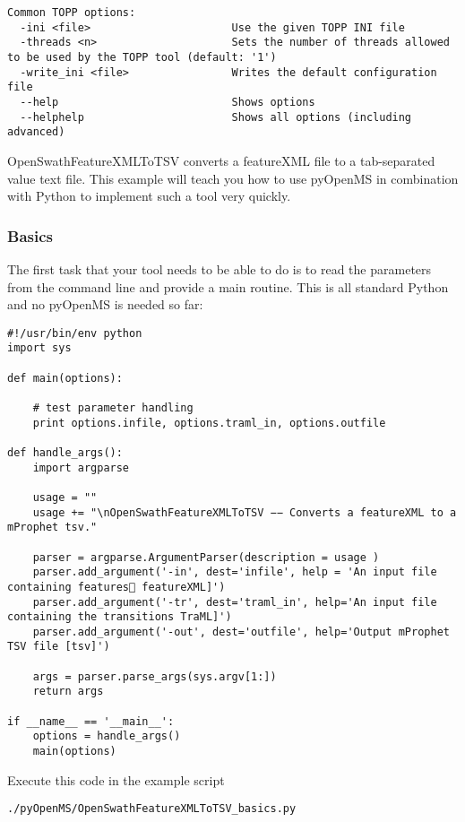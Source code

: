 {\begin{lstlisting}
Common TOPP options:
  -ini <file>                      Use the given TOPP INI file
  -threads <n>                     Sets the number of threads allowed to be used by the TOPP tool (default: '1')
  -write_ini <file>                Writes the default configuration file
  --help                           Shows options
  --helphelp                       Shows all options (including advanced)
\end{lstlisting}

OpenSwathFeatureXMLToTSV converts a featureXML file to a tab-separated value text file. This example will teach you how to use pyOpenMS in combination with Python to implement such a tool very quickly.

\subsubsection{Basics}
The first task that your tool needs to be able to do is to read the parameters from the command line and provide a main routine. This is all standard Python and no pyOpenMS is needed so far:

\begin{lstlisting}
#!/usr/bin/env python
import sys

def main(options):

    # test parameter handling
    print options.infile, options.traml_in, options.outfile

def handle_args():
    import argparse

    usage = ""
    usage += "\nOpenSwathFeatureXMLToTSV −− Converts a featureXML to a mProphet tsv."

    parser = argparse.ArgumentParser(description = usage )
    parser.add_argument('-in', dest='infile', help = 'An input file containing features􏰀 featureXML]')
    parser.add_argument('-tr', dest='traml_in', help='An input file containing the transitions TraML]')
    parser.add_argument('-out', dest='outfile', help='Output mProphet TSV file [tsv]')

    args = parser.parse_args(sys.argv[1:])
    return args

if __name__ == '__main__':
    options = handle_args()
    main(options)
\end{lstlisting}

Execute this code in the example script

\begin{center}
\texttt{./pyOpenMS/OpenSwathFeatureXMLToTSV\_basics.py}
\end{center}

}
